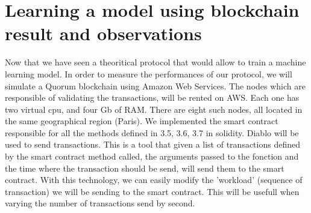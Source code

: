 \documentclass{article}
\begin{document}
\section{Learning a model using blockchain result and observations}
Now that we have seen a theoritical protocol that would allow to train a machine learning model.
In order to measure the performances of our protocol, we will simulate a Quorum blockchain using Amazon Web Services.
The nodes which are responsible of validating the transactions, will be rented on AWS. Each one has two virtual cpu, and
four Gb of RAM. There are eight such nodes, all located in the same geographical region (Paris). We implemented the
smart contract responsible for all the methods defined in {3.5, 3.6, 3.7} in solidity. Diablo will be used to send
transactions. This is a tool that given a list of transactions defined by the smart contract method
called, the arguments passed to the fonction and the time where the transaction should be send, will send them to the
smart contract. With this technology, we can easily modify the 'workload' (sequence of transaction) we will be sending
to the smart contract. This will be usefull when varying the number of transactions send by second.
\end{document}
